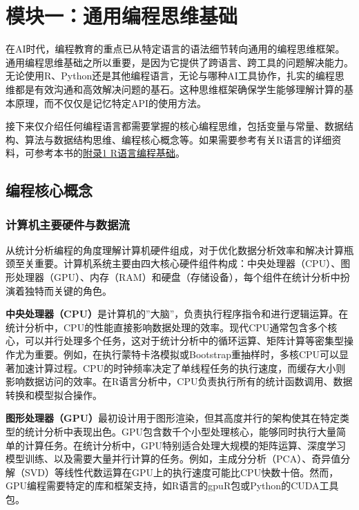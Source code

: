 \documentclass[
]{book}
\begin{document}
\hypertarget{ux6a21ux5757ux4e00ux901aux7528ux7f16ux7a0bux601dux7ef4ux57faux7840}{%
\section{模块一：通用编程思维基础}\label{ux6a21ux5757ux4e00ux901aux7528ux7f16ux7a0bux601dux7ef4ux57faux7840}}

在AI时代，编程教育的重点已从特定语言的语法细节转向通用的编程思维框架。通用编程思维基础之所以重要，是因为它提供了跨语言、跨工具的问题解决能力。无论使用R、Python还是其他编程语言，无论与哪种AI工具协作，扎实的编程思维都是有效沟通和高效解决问题的基石。这种思维框架确保学生能够理解计算的基本原理，而不仅仅是记忆特定API的使用方法。

接下来仅介绍任何编程语言都需要掌握的核心编程思维，包括变量与常量、数据结构、算法与数据结构思维、编程核心概念等。如果需要参考有关R语言的详细资料，可参考本书的\protect\hyperlink{ux9644ux5f551-rux8bedux8a00ux7f16ux7a0bux57faux7840}{附录1 R语言编程基础}。

\hypertarget{ux7f16ux7a0bux6838ux5fc3ux6982ux5ff5}{%
\subsection{编程核心概念}\label{ux7f16ux7a0bux6838ux5fc3ux6982ux5ff5}}

\hypertarget{ux8ba1ux7b97ux673aux4e3bux8981ux786cux4ef6ux4e0eux6570ux636eux6d41}{%
\subsubsection{计算机主要硬件与数据流}\label{ux8ba1ux7b97ux673aux4e3bux8981ux786cux4ef6ux4e0eux6570ux636eux6d41}}

从统计分析编程的角度理解计算机硬件组成，对于优化数据分析效率和解决计算瓶颈至关重要。计算机系统主要由四大核心硬件组件构成：中央处理器（CPU）、图形处理器（GPU）、内存（RAM）和硬盘（存储设备），每个组件在统计分析中扮演着独特而关键的角色。

\textbf{中央处理器（CPU）}是计算机的''大脑''，负责执行程序指令和进行逻辑运算。在统计分析中，CPU的性能直接影响数据处理的效率。现代CPU通常包含多个核心，可以并行处理多个任务，这对于统计分析中的循环运算、矩阵计算等密集型操作尤为重要。例如，在执行蒙特卡洛模拟或Bootstrap重抽样时，多核CPU可以显著加速计算过程。CPU的时钟频率决定了单线程任务的执行速度，而缓存大小则影响数据访问的效率。在R语言分析中，CPU负责执行所有的统计函数调用、数据转换和模型拟合操作。

\textbf{图形处理器（GPU）}最初设计用于图形渲染，但其高度并行的架构使其在特定类型的统计分析中表现出色。GPU包含数千个小型处理核心，能够同时执行大量简单的计算任务。在统计分析中，GPU特别适合处理大规模的矩阵运算、深度学习模型训练、以及需要大量并行计算的任务。例如，主成分分析（PCA）、奇异值分解（SVD）等线性代数运算在GPU上的执行速度可能比CPU快数十倍。然而，GPU编程需要特定的库和框架支持，如R语言的gpuR包或Python的CUDA工具包。
\end{document}

